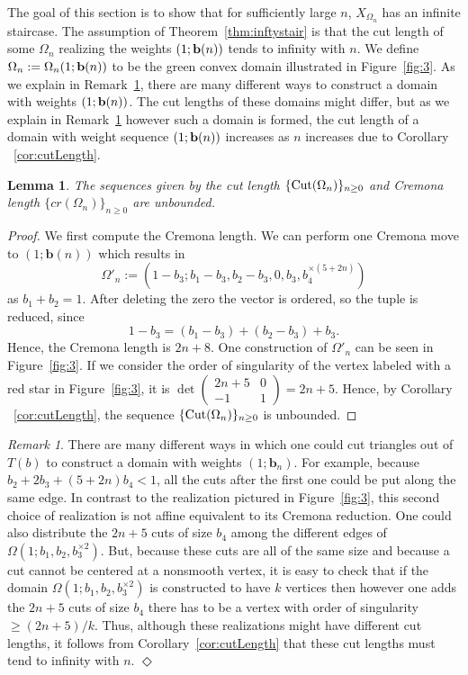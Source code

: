 \documentclass[11pt, reqno]{amsart}
\newtheorem{lemma}[thm]{Lemma}
\theoremstyle{remark}
\numberwithin{equation}{subsection}
\numberwithin{figure}{section}
\theoremstyle{customremark}
\newtheorem{rmk_no_diamond}[thm]{Remark}
\newenvironment{rmk}{\begin{rmk_no_diamond} } {\hfill$\er$ \end{rmk_no_diamond}}
\newcommand{\Om}{{\Omega}}
\newcommand{\er}{{\Diamond}}
\begin{document}
The goal of this section is to show that for sufficiently large $n$, $X_{\Omega_n}$ has an infinite staircase. 
The assumption of Theorem~\ref{thm:inftystair} is that the cut length of some $\Omega_n$ realizing the weights $(1;{\bf b}(n))$ tends to infinity with $n$. We define $\Omega_n:=\Omega_n(1;{\bf b}(n))$ to be the green convex domain illustrated in Figure~\ref{fig:3}. As we explain in Remark~\ref{rmk:cutOm}, there  are many different ways to construct a domain with weights 
$(1;{\bf b}(n))$. The cut lengths of these domains might differ, but as we explain in Remark~\ref{rmk:cutOm} however such a domain is formed, 
 the cut length of a domain with weight sequence $(1;{\bf b}(n))$ increases as $n$ increases due to Corollary ~\ref{cor:cutLength}.




\begin{lemma} \label{lem:cutOmegaN}
	The sequences given by the cut length $\{{\rm Cut}(\Omega_n)\}_{n \geq 0}$ and Cremona length $\{cr(\Omega_n)\}_{n \geq 0}$ are unbounded. 
\end{lemma}
\begin{proof}

We first compute the Cremona length. We can perform one Cremona move to $(1;\bm{b}(n))$ which results in 
\[\Omega'_n:=(1-b_3;b_1-b_3,b_2-b_3,0,b_3,b_4^{\times (5+2n)})\]
as $b_1+b_2=1$. 
After deleting the zero the vector is ordered, so the tuple is reduced, since
\[
1-b_3=(b_1-b_3)+(b_2-b_3)+b_3.
\]
Hence, the Cremona length is  $2n+8$. One construction of $\Omega'_n$ can be seen in Figure~\ref{fig:3}. If we consider the order of singularity of the vertex labeled with a red star in Figure~\ref{fig:3}, it is $\det\begin{pmatrix} 2n+5 & 0 \\ -1 & 1 \end{pmatrix}=2n+5.$ Hence, by Corollary ~\ref{cor:cutLength}, the sequence $\{{\rm Cut}(\Omega_n)\}_{n \geq 0}$ is unbounded. 
\end{proof}


\begin{rmk}\label{rmk:cutOm} \rm There are many different ways in which one could cut triangles out of $T(b)$ to construct a domain with weights $(1; \bm{b}_n)$.  For example, because $b_2 + 2b_3 + (5+2n)b_4< 1$, all the cuts after the first one could be put along the same edge.  In contrast to the realization pictured in Figure~\ref{fig:3}, this second choice  of realization is not affine equivalent to its Cremona reduction.  One could also  distribute the $2n+5$ cuts of size $b_4$   among the different edges of $\Om(1; b_1,b_2,b_3^{\times 2})$.  But, because these cuts are all of the same size and because a cut cannot be centered at a nonsmooth vertex, it is easy to check that if the domain $\Om(1; b_1,b_2, b_3^{\times 2}) $ is constructed to have $k$ vertices then however one adds the $2n+5$ cuts of size $b_4$ there has to be a vertex with order of singularity $\ge (2n+5)/k$. Thus, although these realizations might have different cut lengths, it follows from Corollary~\ref{cor:cutLength} that these cut lengths must tend to infinity with $n$.
\end{rmk}
\end{document}
